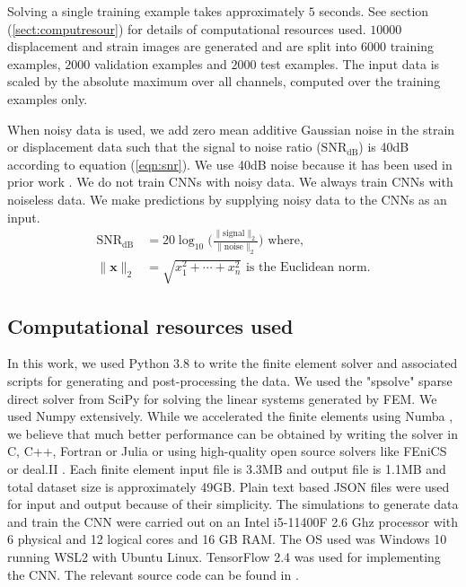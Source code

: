 \documentclass[12pt]{article}
\begin{document}
Solving a single training example takes approximately $5$ seconds. See section (\ref{sect:computresour}) for details of computational resources used. $10000$ displacement and strain images are generated and are split into $6000$ training examples, $2000$ validation examples and $2000$ test examples. The input data is scaled by the absolute maximum over all channels, computed over the training examples only.

When noisy data is used, we add zero mean additive Gaussian noise in the strain or displacement data such that the signal to noise ratio ($\text{SNR}_{\text{dB}}$) is 40dB according to equation (\ref{eqn:snr}). We use 40dB noise because it has been used in prior work \cite{paper:doyley}. We do not train CNNs with noisy data. We always train CNNs with noiseless data. We make predictions by supplying noisy data to the CNNs as an input. 
\begin{subequations}
\begin{align}
  \text{SNR}_{\text{dB}} &= 20\log_{10}{\Bigg (}\frac{\|\text{signal}\|_{2}}{\|\text{noise}\|_{2}}{\Bigg )} \label{eqn:snr} \text{ where, }\\
  \|\mathbf{x}\|_{2} &= \sqrt{x_{1}^{2}+\cdots+x_{n}^2}  \text{ is the Euclidean norm.}   \label{eqn:eucnorm}
\end{align}
\end{subequations}  
\subsection{\label{sect:computresour} Computational resources used}
In this work, we used Python 3.8 to write the finite element solver \cite{misc:fypy} and associated scripts \cite{misc:mlscripts} for generating and post-processing the data. We used the "spsolve" sparse direct solver from SciPy \cite{paper:scipy} for solving the linear systems generated by FEM. We used Numpy \cite{paper:numpy} extensively. While we accelerated the finite elements using Numba \cite{conf:numba}, we believe that much better performance can be obtained by writing the solver in C, C++, Fortran or Julia or using high-quality open source solvers like FEniCS \cite{paper:fenics} or deal.II \cite{paper:deal.ii}. Each finite element input file is 3.3MB and output file is 1.1MB and total dataset size is approximately 49GB. Plain text based JSON files were used for input and output because of their simplicity. The simulations to generate data and train the CNN were carried out on an Intel i5-11400F 2.6 Ghz processor with 6 physical and 12 logical cores and 16 GB RAM. The OS used was Windows 10 running WSL2 with Ubuntu Linux. TensorFlow 2.4 \cite{misc:tensorflow} was used for implementing the CNN. The relevant source code can be found in \cite{misc:mlscripts}.
%
\end{document}
